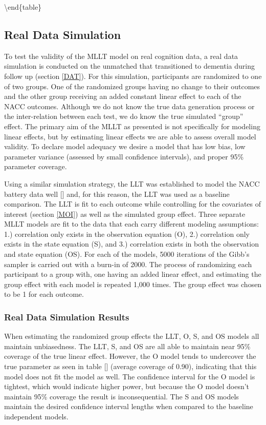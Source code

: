 \documentclass[
]{article}
\begin{document}
\textbackslash end\{table\}

\hypertarget{real-data-simulation}{%
\subsection{Real Data Simulation}\label{real-data-simulation}}

To test the validity of the MLLT model on real cognition data, a real data simulation is conducted on the unmatched that transitioned to dementia during follow up (section \ref{DAT}). For this simulation, participants are randomized to one of two groups. One of the randomized groups having no change to their outcomes and the other group receiving an added constant linear effect to each of the NACC outcomes. Although we do not know the true data generation process or the inter-relation between each test, we do know the true simulated ``group'' effect. The primary aim of the MLLT as presented is not specifically for modeling linear effects, but by estimating linear effects we are able to assess overall model validity. To declare model adequacy we desire a model that has low bias, low parameter variance (assessed by small confidence intervals), and proper 95\% parameter coverage.

Using a similar simulation strategy, the LLT was established to model the NACC battery data well {[}{]} and, for this reason, the LLT was used as a baseline comparison. The LLT is fit to each outcome while controlling for the covariates of interest (section \ref{MOI}) as well as the simulated group effect. Three separate MLLT models are fit to the data that each carry different modeling assumptions: 1.) correlation only exists in the observation equation (O), 2.) correlation only exists in the state equation (S), and 3.) correlation exists in both the observation and state equation (OS). For each of the models, 5000 iterations of the Gibb's sampler is carried out with a burn-in of 2000. The process of randomizing each participant to a group with, one having an added linear effect, and estimating the group effect with each model is repeated 1,000 times. The group effect was chosen to be 1 for each outcome.

\hypertarget{real-data-simulation-results}{%
\subsubsection{Real Data Simulation Results}\label{real-data-simulation-results}}

When estimating the randomized group effects the LLT, O, S, and OS models all maintain unbiasedness. The LLT, S, and OS are all able to maintain near 95\% coverage of the true linear effect. However, the O model tends to undercover the true parameter as seen in table {[}{]} (average coverage of 0.90), indicating that this model does not fit the model as well. The confidence interval for the O model is tightest, which would indicate higher power, but because the O model doesn't maintain 95\% coverage the result is inconsequential. The S and OS models maintain the desired confidence interval lengths when compared to the baseline independent models.
\end{document}
